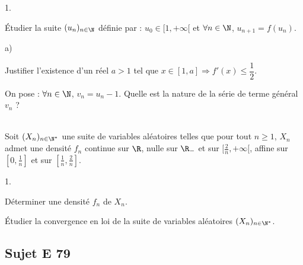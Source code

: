 \documentclass[11pt]{article}%
\begin{document}
\begin{exerciceAP}
\begin{noliste}{1.}
  \item Étudier la suite $(u_n)_{n\in\N}$ définie par :
    $u_0\in[1,+\infty[$ et $\forall n\in\N$, $u_{n+1}=f(u_n)$.

  \item
    \begin{noliste}{a)}
    \setlength{\itemsep}{2mm}
    \item Justifier l'existence d'un réel $a>1$ tel que $x\in[1,a]
      \Rightarrow f'(x)\leq \dfrac{1}{2}$.
    \item On pose : $\forall n\in\N$, $v_n=u_n-1$. Quelle est la
      nature de la série de terme général $v_n$ ?
    \end{noliste}
  \end{noliste}
\end{exerciceAP}


\newpage



\begin{exerciceSP}~\\
  Soit $(X_n)_{n\in\N^*}$ une suite de variables aléatoires telles que
  pour tout $n\geq 1$, $X_n$ admet une densité $f_n$ continue sur
  $\R$, nulle sur $\R_-$ et sur $[\frac{2}{n}, +\infty [$, affine sur
  $[0, \frac{1}{n}]$ et sur $[ \frac{1}{n}, \frac{2}{n}]$.
  \begin{noliste}{1.}
    \setlength{\itemsep}{2mm}
  \item Déterminer une densité $f_n$ de $X_n$.
  \item Étudier la convergence en loi de la suite de variables
    aléatoires $(X_n)_{n\in\N^*}$.
  \end{noliste}
\end{exerciceSP}


\newpage

\subsection*{Sujet E 79}

\end{document}
